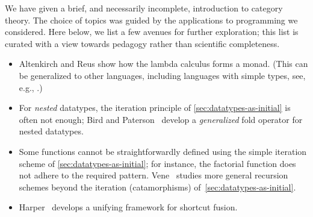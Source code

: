 \documentclass[a4paper,10pt]{scrartcl}
\theoremstyle{plain}
\theoremstyle{definition}
\begin{document}
We have given a brief, and necessarily incomplete, introduction to category theory.
The choice of topics was guided by the applications to programming we considered.
 Here below, we list a few avenues for further exploration; this list is curated with a view towards pedagogy rather than scientific completeness.
\begin{itemize}
\item Altenkirch and Reus show how the lambda calculus forms a monad.
  (This can be generalized to other languages, including languages with simple types, see, e.g., \cite{DBLP:journals/jfrea/AhrensZ11}.)
\item For \emph{nested} datatypes, the iteration principle of \cref{sec:datatypes-as-initial} is often not enough; Bird and Paterson~\cite{DBLP:journals/fac/BirdP99} develop a \emph{generalized} fold operator for nested datatypes.
\item Some functions cannot be straightforwardly defined using the simple iteration scheme of \cref{sec:datatypes-as-initial}; for instance, the factorial function does not adhere to the required pattern.
  Vene~\cite{vene_phd} studies more general recursion schemes beyond the iteration (catamorphisms) of~\cref{sec:datatypes-as-initial}.
\item Harper~\cite{DBLP:phd/ethos/Harper13} develops a unifying framework for shortcut fusion.

\end{itemize}


\appendix










\printbibliography
\end{document}
